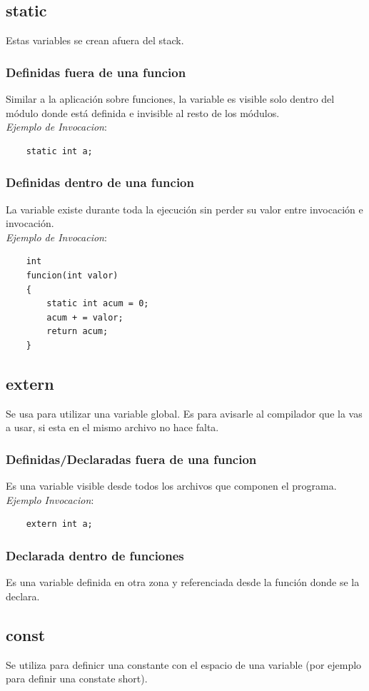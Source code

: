 \documentclass{article}
\begin{document}
\subsection{static}
Estas variables se crean afuera del stack.
\subsubsection*{Definidas fuera de una funcion}
Similar a la aplicación sobre funciones, la variable es visible solo dentro del módulo donde está definida e invisible al resto de los módulos.
\\\emph{Ejemplo de Invocacion}:
\begin{lstlisting}
    static int a;
\end{lstlisting}
\subsubsection*{Definidas dentro de una funcion}
La variable existe durante toda la ejecución sin perder su valor entre invocación e invocación.
\\\emph{Ejemplo de Invocacion}:
\begin{lstlisting}
    int
    funcion(int valor)
    {
        static int acum = 0;
        acum + = valor;
        return acum;
    }
\end{lstlisting}

\subsection{extern}
Se usa para utilizar una variable global. 
Es para avisarle al compilador que la vas a usar, si esta en el mismo archivo no hace falta.
\subsubsection*{Definidas/Declaradas fuera de una funcion}
Es una variable visible desde todos los archivos que componen el programa.
\\\emph{Ejemplo Invocacion}:
\begin{lstlisting}
    extern int a;
\end{lstlisting}
\subsubsection*{Declarada dentro de funciones}
Es una variable definida en otra zona y referenciada desde la función donde se la declara.

\subsection{const}
Se utiliza para definicr una constante con el espacio de una variable (por ejemplo para definir una constate short).
\newpage
\end{document}
